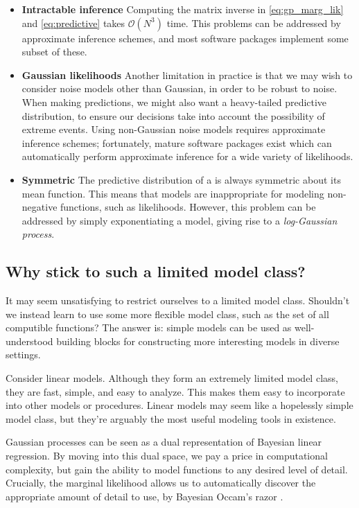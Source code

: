 \begin{itemize}
\item {\bf Intractable inference}
Computing the matrix inverse in \eqref{eq:gp_marg_lik} and \eqref{eq:predictive} takes $\mathcal{O}(N^3)$ time.%
This problems can be addressed by approximate inference schemes, and most \gp{} software packages implement some subset of these.
\item {\bf Gaussian likelihoods}
Another limitation in practice is that we may wish to consider noise models other than Gaussian, in order to be robust to noise.
When making predictions, we might also want a heavy-tailed predictive distribution, to ensure our decisions take into account the possibility of extreme events.
Using non-Gaussian noise models requires approximate inference schemes; fortunately, mature software packages exist which can automatically perform approximate inference for a wide variety of likelihoods.
\item {\bf Symmetric}
The predictive distribution of a \gp{} is always symmetric about its mean function.
This means that \gp{} models are inappropriate for modeling non-negative functions, such as likelihoods.
However, this problem can be addressed by simply exponentiating a \gp{} model, giving rise to a \emph{log-Gaussian process}.
\end{itemize}

\subsection{Why stick to such a limited model class?}
It may seem unsatisfying to restrict ourselves to a limited model class.
Shouldn't we instead learn to use some more flexible model class, such as the set of all computible functions?
The answer is: simple models can be used as well-understood building blocks for constructing more interesting models in diverse settings.

Consider linear models.
Although they form an extremely limited model class, they are fast, simple, and easy to analyze.
This makes them easy to incorporate into other models or procedures.
Linear models may seem like a hopelessly simple model class, but they're arguably the most useful modeling tools in existence.

Gaussian processes can be seen as a dual representation of Bayesian linear regression.
By moving into this dual space, we pay a price in computational complexity, but gain the ability to model functions to any desired level of detail.
Crucially, the marginal likelihood allows us to automatically discover the appropriate amount of detail to use, by Bayesian Occam's razor \citep{rasmussen2001occam,mackay2003information}.



